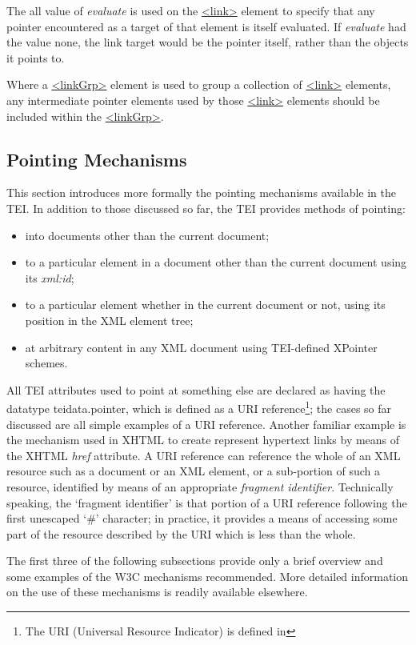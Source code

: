 The all value of {\itshape evaluate} is used on the \hyperref[TEI.link]{<link>} element to specify that any pointer encountered as a target of that element is itself evaluated. If {\itshape evaluate} had the value none, the link target would be the pointer itself, rather than the objects it points to.\par
Where a \hyperref[TEI.linkGrp]{<linkGrp>} element is used to group a collection of \hyperref[TEI.link]{<link>} elements, any intermediate pointer elements used by those \hyperref[TEI.link]{<link>} elements should be included within the \hyperref[TEI.linkGrp]{<linkGrp>}.
\subsection[{Pointing Mechanisms}]{Pointing Mechanisms}\label{SAXP}\par
This section introduces more formally the pointing mechanisms available in the TEI. In addition to those discussed so far, the TEI provides methods of pointing: \begin{itemize}
\item into documents other than the current document;
\item to a particular element in a document other than the current document using its {\itshape xml:id};
\item to a particular element whether in the current document or not, using its position in the XML element tree;
\item at arbitrary content in any XML document using TEI-defined XPointer schemes.
\end{itemize} \par
All TEI attributes used to point at something else are declared as having the datatype \textsf{teidata.pointer}, which is defined as a URI reference\footnote{The URI (Universal Resource Indicator) is defined in }; the cases so far discussed are all simple examples of a URI reference. Another familiar example is the mechanism used in XHTML to create represent hypertext links by means of the XHTML {\itshape href} attribute. A URI reference can reference the whole of an XML resource such as a document or an XML element, or a sub-portion of such a resource, identified by means of an appropriate \textit{fragment identifier}. Technically speaking, the ‘fragment identifier’ is that portion of a URI reference following the first unescaped ‘\#’ character; in practice, it provides a means of accessing some part of the resource described by the URI which is less than the whole. \par
The first three of the following subsections provide only a brief overview and some examples of the W3C mechanisms recommended. More detailed information on the use of these mechanisms is readily available elsewhere.
